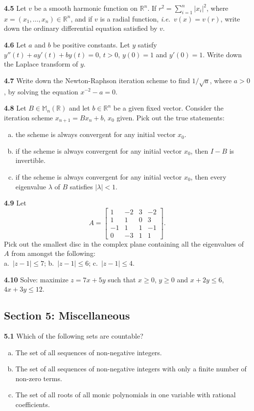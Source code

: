 \documentclass[11pt,a4paper]{article}
\newcommand{\R}{\mathbb{R}}
\newcommand{\M}{\mathbb{M}}
\newcommand{\examsec}[1]{%
  \subsection*{#1}
  \vspace{-2pt}
}
\newcommand{\qitem}[1]{\par\medskip\noindent\textbf{#1}\hspace{0.5em}}
\begin{document}
\qitem{4.5} Let $v$ be a smooth harmonic function on $\R^n$. If $r^2 = \sum_{i=1}^{n} |x_i|^2$, where $x = (x_1, \dots, x_n) \in \R^n$, and if $v$ is a radial function, \emph{i.e.}\ $v(x) = v(r)$, write down the ordinary differential equation satisfied by $v$.

\qitem{4.6} Let $a$ and $b$ be positive constants. Let $y$ satisfy $y''(t) + ay'(t) + by(t) = 0$, $t > 0$, $y(0) = 1$ and $y'(0) = 1$. Write down the Laplace transform of $y$.

\qitem{4.7} Write down the Newton-Raphson iteration scheme to find $1/\sqrt{a}$, where $a > 0$, by solving the equation $x^{-2} - a = 0$.

\qitem{4.8} Let $B \in \M_n(\R)$ and let $b \in \R^n$ be a given fixed vector. Consider the iteration scheme $x_{n+1} = Bx_n + b$, $x_0$ given. Pick out the true statements:
\begin{enumerate}[a.]
  \item the scheme is always convergent for any initial vector $x_0$.
  \item if the scheme is always convergent for any initial vector $x_0$, then $I - B$ is invertible.
  \item if the scheme is always convergent for any initial vector $x_0$, then every eigenvalue $\lambda$ of $B$ satisfies $|\lambda| < 1$.
\end{enumerate}

\qitem{4.9} Let
\[
  A = \begin{bmatrix} 1 & -2 & 3 & -2 \\ 1 & 1 & 0 & 3 \\ -1 & 1 & 1 & -1 \\ 0 & -3 & 1 & 1 \end{bmatrix}.
\]
Pick out the smallest disc in the complex plane containing all the eigenvalues of $A$ from amongst the following:\\
a.\ $|z - 1| \le 7$; \qquad b.\ $|z - 1| \le 6$; \qquad c.\ $|z - 1| \le 4$.

\qitem{4.10} Solve: maximize $z = 7x + 5y$ such that $x \ge 0$, $y \ge 0$ and $x + 2y \le 6$, $4x + 3y \le 12$.

\examsec{Section 5: Miscellaneous}

\qitem{5.1} Which of the following sets are countable?
\begin{enumerate}[a.]
  \item The set of all sequences of non-negative integers.
  \item The set of all sequences of non-negative integers with only a finite number of non-zero terms.
  \item The set of all roots of all monic polynomials in one variable with rational coefficients.
\end{enumerate}
\end{document}
